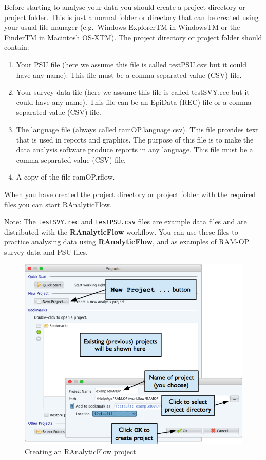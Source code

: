\documentclass[12pt,]{book}
\theoremstyle{definition}
\theoremstyle{definition}
\theoremstyle{definition}
\theoremstyle{remark}
\begin{document}
Before starting to analyse your data you should create a project
directory or project folder. This is just a normal folder or directory
that can be created using your usual file manager (e.g.~Windows
ExplorerTM in WindowsTM or the FinderTM in Macintosh OS-XTM). The
project directory or project folder should contain:

\begin{enumerate}
\def\labelenumi{\arabic{enumi}.}
\item
  Your PSU file (here we assume this file is called testPSU.csv but it
  could have any name). This file must be a comma-separated-value (CSV)
  file.
\item
  Your survey data file (here we assume this file is called testSVY.rec
  but it could have any name). This file can be an EpiData (REC) file or
  a comma-separated-value (CSV) file.
\item
  The language file (always called ramOP.language.csv). This file
  provides text that is used in reports and graphics. The purpose of
  this file is to make the data analysis software produce reports in any
  language. This file must be a comma-separated-value (CSV) file.
\item
  A copy of the file ramOP.rflow.
\end{enumerate}

When you have created the project directory or project folder with the
required files you can start RAnalyticFlow.

Note: The \texttt{testSVY.rec} and \texttt{testPSU.csv} files are
example data files and are distributed with the \textbf{RAnalyticFlow}
workflow. You can use these files to practice analysing data using
\textbf{RAnalyticFlow}, and as examples of RAM-OP survey data and PSU
files.

\begin{figure}[h]

{\centering \includegraphics[width=9.62in]{figures/openProjectRAF} 

}

\caption{Creating an RAnalyticFlow project}\label{fig:raf2}
\end{figure}
\end{document}
